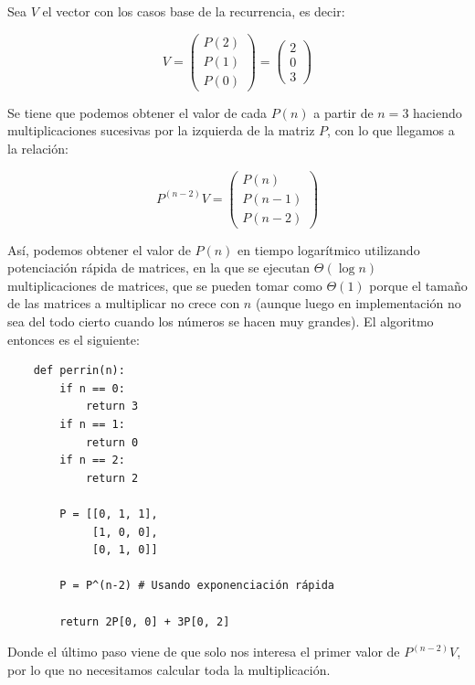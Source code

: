 \documentclass[letterpaper, 12pt]{article}
\begin{document}
\begin{enumerate}
Sea $V$ el vector con los casos base de la recurrencia, es decir:

\begin{equation*}
    V =
\begin{pmatrix}
        P(2) \\
        P(1) \\
        P(0)
\end{pmatrix}
=
\begin{pmatrix}
        2 \\
        0 \\
        3
\end{pmatrix}
\end{equation*}

Se tiene que podemos obtener el valor de cada $P(n)$ a partir de $n=3$ haciendo multiplicaciones sucesivas por la izquierda de la matriz $P$, con lo que llegamos a la relación:

\begin{equation*}
    {P}^{(n-2)}V =
\begin{pmatrix}
    P(n) \\
    P(n-1) \\
    P(n-2)
\end{pmatrix}
\end{equation*}

Así, podemos obtener el valor de $P(n)$ en tiempo logarítmico utilizando potenciación rápida de matrices, en la que se ejecutan $\Theta(\log n)$ multiplicaciones de matrices, que se pueden tomar como $\Theta(1)$ porque el tamaño de las matrices a multiplicar no crece con $n$ (aunque luego en implementación no sea del todo cierto cuando los números se hacen muy grandes). El algoritmo entonces es el siguiente:

\newpage

\begin{verbatim}
    def perrin(n):
        if n == 0:
            return 3
        if n == 1:
            return 0
        if n == 2:
            return 2

        P = [[0, 1, 1],
             [1, 0, 0],
             [0, 1, 0]]

        P = P^(n-2) # Usando exponenciación rápida

        return 2P[0, 0] + 3P[0, 2]
\end{verbatim}

Donde el último paso viene de que solo nos interesa el primer valor de $P^{(n-2)}V$, por lo que no necesitamos calcular toda la multiplicación. \\


\end{enumerate}
\end{document}
